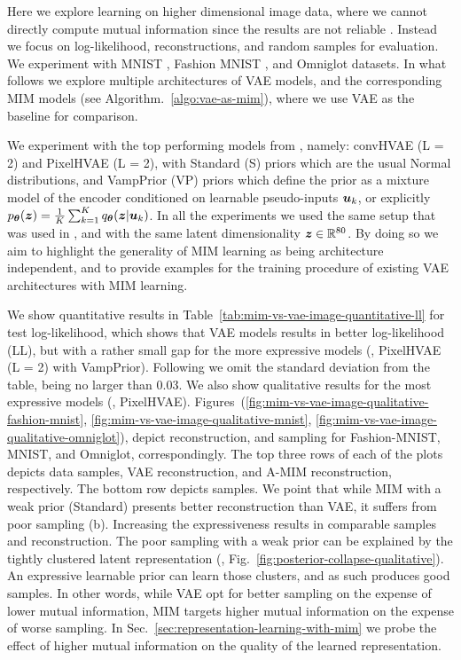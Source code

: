Here we explore learning on higher dimensional image data, where we cannot directly compute mutual information since the results are not reliable \cite{Hjelm2018}. Instead we focus on log-likelihood, reconstructions, and random samples for evaluation. We experiment with MNIST \cite{LeCun1998}, Fashion MNIST \cite{DBLP:journals/corr/abs-1708-07747}, and Omniglot \cite{Lake2015} datasets.
In what follows we explore multiple architectures of VAE models, and the corresponding MIM models (see Algorithm.\ \ref{algo:vae-as-mim}), where we use VAE as the baseline for comparison.

We experiment with the top performing models from \cite{DBLP:journals/corr/TomczakW17}, namely: convHVAE (L = 2) and PixelHVAE (L = 2), with Standard (S) priors which are the usual Normal distributions, and VampPrior (VP) priors which define the prior as a mixture model of the encoder conditioned on learnable pseudo-inputs $\boldsymbol{u}_k$, or explicitly $p_{{\boldsymbol \theta}}({\boldsymbol z}) = \frac{1}{K}\sum_{k=1}^{K} q_{{\boldsymbol \theta}}({\boldsymbol z}|\boldsymbol{u}_k)$. In all the experiments we used the same setup that was used in \cite{DBLP:journals/corr/TomczakW17}, and with the same latent dimensionality ${\boldsymbol z} \in \mathbb{R}^{80}$. By doing so we aim to highlight the generality of MIM learning as being architecture independent, and to provide examples for the training procedure of existing VAE architectures with MIM learning. 

We show quantitative results in Table\ \ref{tab:mim-vs-vae-image-quantitative-ll} for test log-likelihood,
which shows that VAE models results in better log-likelihood (LL), but with a rather small gap for the more expressive models (\ie, PixelHVAE (L = 2) with VampPrior). Following \cite{DBLP:journals/corr/TomczakW17} we omit the standard deviation from the table, being no larger than 0.03. We also show qualitative results for the most expressive models (\ie, PixelHVAE). Figures\ (\ref{fig:mim-vs-vae-image-qualitative-fashion-mnist}, \ref{fig:mim-vs-vae-image-qualitative-mnist}, \ref{fig:mim-vs-vae-image-qualitative-omniglot}), depict reconstruction, and sampling for Fashion-MNIST, MNIST, and Omniglot, correspondingly.
The top three rows of each of the plots depicts data samples, VAE reconstruction, and A-MIM reconstruction, respectively. The bottom row depicts samples. We point that while MIM with a weak prior (Standard) presents better reconstruction than VAE, it suffers from poor sampling (b). Increasing the expressiveness results in comparable samples and reconstruction.
The poor sampling with a weak prior can be explained by the tightly clustered latent representation (\eg, Fig.\ \ref{fig:posterior-collapse-qualitative}). An expressive learnable prior can learn those clusters, and as such produces good samples.
In other words, while VAE opt for better sampling on the expense of lower mutual information, MIM targets higher mutual information on the expense of worse sampling. In Sec.\ \ref{sec:representation-learning-with-mim} we probe the effect of higher mutual information on the quality of the learned representation.


